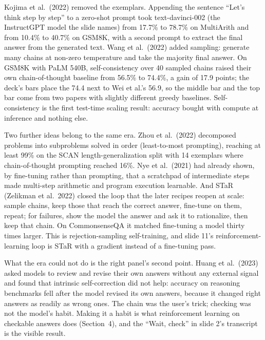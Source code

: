 \documentclass[11pt,letterpaper]{article}
\begin{document}
Kojima et al.\ (2022) removed the exemplars. Appending the sentence ``Let's think step by step'' to a zero-shot prompt took text-davinci-002 (the InstructGPT model the slide names) from 17.7\% to 78.7\% on MultiArith and from 10.4\% to 40.7\% on GSM8K, with a second prompt to extract the final answer from the generated text. Wang et al.\ (2022) added sampling: generate many chains at non-zero temperature and take the majority final answer. On GSM8K with PaLM 540B, self-consistency over 40 sampled chains raised their own chain-of-thought baseline from 56.5\% to 74.4\%, a gain of 17.9 points; the deck's bars place the 74.4 next to Wei et al.'s 56.9, so the middle bar and the top bar come from two papers with slightly different greedy baselines. Self-consistency is the first test-time scaling result: accuracy bought with compute at inference and nothing else.

Two further ideas belong to the same era. Zhou et al.\ (2022) decomposed problems into subproblems solved in order (least-to-most prompting), reaching at least 99\% on the SCAN length-generalization split with 14 exemplars where chain-of-thought prompting reached 16\%. Nye et al.\ (2021) had already shown, by fine-tuning rather than prompting, that a scratchpad of intermediate steps made multi-step arithmetic and program execution learnable. And STaR (Zelikman et al.\ 2022) closed the loop that the later recipes reopen at scale: sample chains, keep those that reach the correct answer, fine-tune on them, repeat; for failures, show the model the answer and ask it to rationalize, then keep that chain. On CommonsenseQA it matched fine-tuning a model thirty times larger. This is rejection-sampling self-training, and slide 11's reinforcement-learning loop is STaR with a gradient instead of a fine-tuning pass.

What the era could not do is the right panel's second point. Huang et al.\ (2023) asked models to review and revise their own answers without any external signal and found that intrinsic self-correction did not help: accuracy on reasoning benchmarks fell after the model revised its own answers, because it changed right answers as readily as wrong ones. The chain was the user's trick; checking was not the model's habit. Making it a habit is what reinforcement learning on checkable answers does (Section~4), and the ``Wait, check'' in slide 2's transcript is the visible result.
\end{document}
